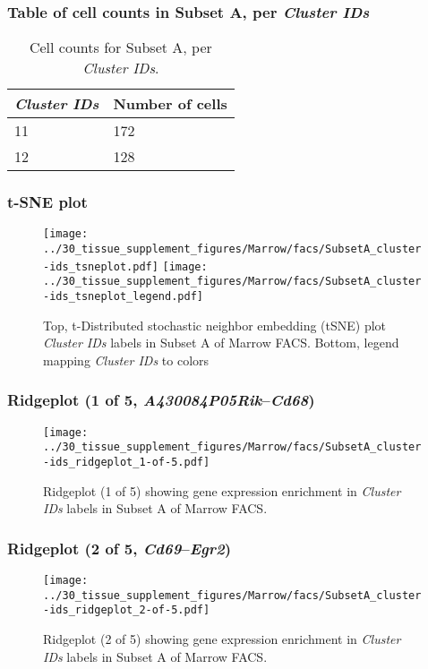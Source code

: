 \subsubsection{Table of cell counts in Subset A, per \emph{Cluster IDs}}\begin{table}[h]
\centering
\label{my-label}
\begin{tabular}{@{}ll@{}}
\toprule

\emph{Cluster IDs}& Number of cells \\ \midrule
11 & 172 \\

12 & 128 \\
\bottomrule
\end{tabular}
\caption{Cell counts for Subset A, per \emph{Cluster IDs}.}
\end{table}

\clearpage
\subsubsection{t-SNE plot}
\begin{figure}[h]
\centering
\texttt{[image: ../30\_tissue\_supplement\_figures/Marrow/facs/SubsetA\_cluster-ids\_tsneplot.pdf]}
\texttt{[image: ../30\_tissue\_supplement\_figures/Marrow/facs/SubsetA\_cluster-ids\_tsneplot\_legend.pdf]}
\caption{Top, t-Distributed stochastic neighbor embedding (tSNE) plot  \emph{Cluster IDs} labels in Subset A of Marrow FACS. Bottom, legend mapping \emph{Cluster IDs} to colors}
\end{figure}


\clearpage

\subsubsection{Ridgeplot (1 of 5, \emph{A430084P05Rik}--\emph{Cd68})}
\begin{figure}[h]
\centering
\texttt{[image: ../30\_tissue\_supplement\_figures/Marrow/facs/SubsetA\_cluster-ids\_ridgeplot\_1-of-5.pdf]}

\caption{ Ridgeplot (1 of 5)  showing gene expression enrichment in \emph{Cluster IDs} labels in Subset A of Marrow FACS. }
\end{figure}


\clearpage

\subsubsection{Ridgeplot (2 of 5, \emph{Cd69}--\emph{Egr2})}
\begin{figure}[h]
\centering
\texttt{[image: ../30\_tissue\_supplement\_figures/Marrow/facs/SubsetA\_cluster-ids\_ridgeplot\_2-of-5.pdf]}

\caption{ Ridgeplot (2 of 5)  showing gene expression enrichment in \emph{Cluster IDs} labels in Subset A of Marrow FACS. }
\end{figure}



